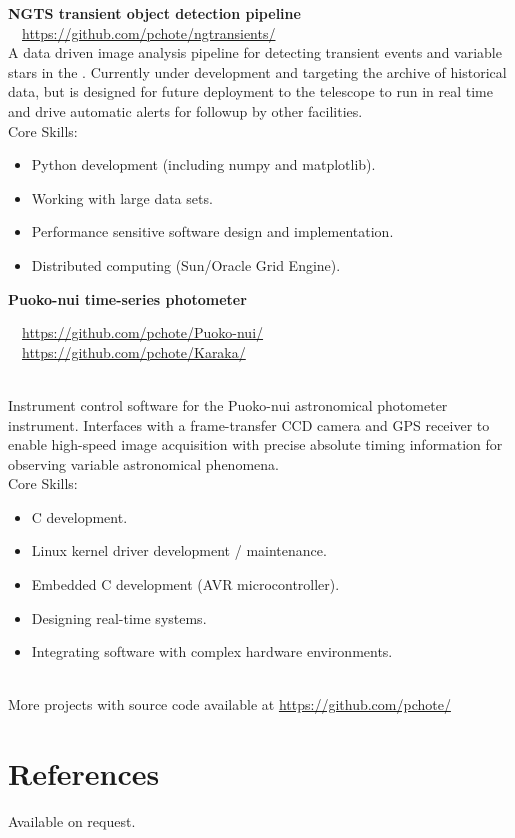 \documentclass[print]{cv-style}
\begin{document}
\parbox[t]{12.8cm}{%
    \textbf{NGTS transient object detection pipeline}%
    \hfill%
    {\small\color{lightgray} \faGithub~~\url{https://github.com/pchote/ngtransients/}}\\%
    A data driven image analysis pipeline for detecting transient events and variable stars in the .  Currently under development and targeting the archive of historical data, but is designed for future deployment to the telescope to run in real time and drive automatic alerts for followup by other facilities.
    \vspace{\parsep}\\
    Core Skills:
    \begin{itemize}
      \item Python development (including numpy and matplotlib).
      \item Working with large data sets.
      \item Performance sensitive software design and implementation.
      \item Distributed computing (Sun/Oracle Grid Engine).
    \end{itemize}
}

\parbox[t]{12.8cm}{%
    \textbf{Puoko-nui time-series photometer}%
    \hfill{\small\color{lightgray} \parbox{6.4cm}{\faGithub~~\url{https://github.com/pchote/Puoko-nui/} \\ \faGithub~~\url{https://github.com/pchote/Karaka/}}}\\%
    Instrument control software for the Puoko-nui astronomical photometer instrument.  Interfaces with a frame-transfer CCD camera and GPS receiver to enable high-speed image acquisition with precise absolute timing information for observing variable astronomical phenomena.
    \vspace{\parsep}\\
    Core Skills:
    \begin{itemize}
      \item C development.
      \item Linux kernel driver development / maintenance.
      \item Embedded C development (AVR microcontroller).
      \item Designing real-time systems.
      \item Integrating software with complex hardware environments.
    \end{itemize}
}\\

{More projects with source code available at \url{https://github.com/pchote/}\vspace{5mm}}\\

\section{References}
{\small Available on request.}
\end{document}
